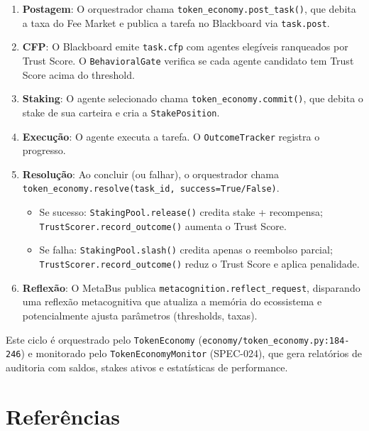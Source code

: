 \begin{enumerate}
    \item \textbf{Postagem}: O orquestrador chama \texttt{token\_economy.post\_task()}, que debita a taxa do Fee Market e publica a tarefa no Blackboard via \texttt{task.post}.
    
    \item \textbf{CFP}: O Blackboard emite \texttt{task.cfp} com agentes elegíveis ranqueados por Trust Score. O \texttt{BehavioralGate} verifica se cada agente candidato tem Trust Score acima do threshold.
    
    \item \textbf{Staking}: O agente selecionado chama \texttt{token\_economy.commit()}, que debita o stake de sua carteira e cria a \texttt{StakePosition}.
    
    \item \textbf{Execução}: O agente executa a tarefa. O \texttt{OutcomeTracker} registra o progresso.
    
    \item \textbf{Resolução}: Ao concluir (ou falhar), o orquestrador chama \texttt{token\_economy.resolve(task\_id, success=True/False)}.
        \begin{itemize}
            \item Se sucesso: \texttt{StakingPool.release()} credita stake + recompensa; \texttt{TrustScorer.record\_outcome()} aumenta o Trust Score.
            \item Se falha: \texttt{StakingPool.slash()} credita apenas o reembolso parcial; \texttt{TrustScorer.record\_outcome()} reduz o Trust Score e aplica penalidade.
        \end{itemize}
    
    \item \textbf{Reflexão}: O MetaBus publica \texttt{metacognition.reflect\_request}, disparando uma reflexão metacognitiva que atualiza a memória do ecossistema e potencialmente ajusta parâmetros (thresholds, taxas).
\end{enumerate}

Este ciclo é orquestrado pelo \texttt{TokenEconomy} (\texttt{economy/token\_economy.py:184-246}) e monitorado pelo \texttt{TokenEconomyMonitor} (SPEC-024), que gera relatórios de auditoria com saldos, stakes ativos e estatísticas de performance.

\section{Referências}

